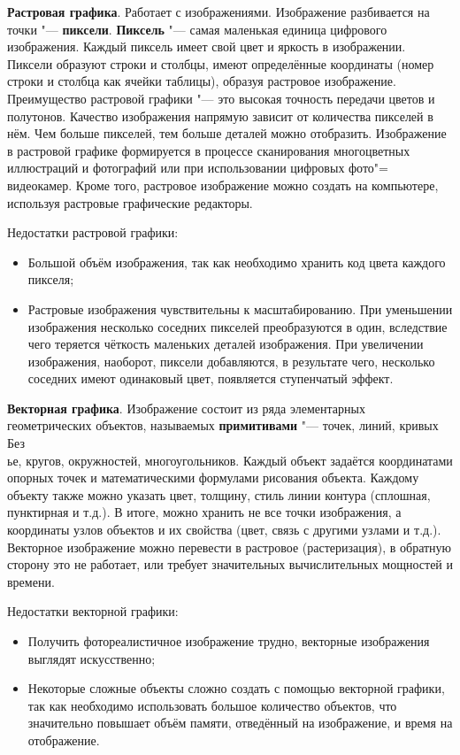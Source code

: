 \textbf{Растровая графика}. Работает с изображениями. Изображение разбивается на точки "--- \textbf{пиксели}. \textbf{Пиксель} "--- самая маленькая единица цифрового изображения. Каждый пиксель имеет свой цвет и яркость в изображении. Пиксели образуют строки и столбцы, имеют определённые координаты (номер строки и столбца как ячейки таблицы), образуя растровое изображение. Преимущество растровой графики "--- это высокая точность передачи цветов и полутонов. Качество изображения напрямую зависит от количества пикселей в нём. Чем больше пикселей, тем больше деталей можно отобразить. Изображение в растровой графике формируется в процессе сканирования многоцветных иллюстраций и фотографий или при использовании цифровых фото"= видеокамер. Кроме того, растровое изображение можно создать на компьютере, используя растровые графические редакторы. \cite{burceva2023cg}

Недостатки растровой графики:
\begin{itemize}
    \item Большой объём изображения, так как необходимо хранить код цвета каждого пикселя;
    \item Растровые изображения чувствительны к масштабированию. При уменьшении изображения несколько соседних пикселей преобразуются в один, вследствие чего теряется чёткость маленьких деталей изображения. При увеличении изображения, наоборот, пиксели добавляются, в результате чего, несколько соседних имеют одинаковый цвет, появляется ступенчатый эффект.
\end{itemize}

\textbf{Векторная графика}. Изображение состоит из ряда элементарных геометрических объектов, называемых \textbf{примитивами} "--- точек, линий, кривых Без\\ье, кругов, окружностей, многоугольников. Каждый объект задаётся координатами опорных точек и математическими формулами рисования объекта. Каждому объекту также можно указать цвет, толщину, стиль линии контура (сплошная, пунктирная и т.д.). В итоге, можно хранить не все точки изображения, а координаты узлов объектов и их свойства (цвет, связь с другими узлами и т.д.). Векторное изображение можно перевести в растровое (растеризация), в обратную сторону это не работает, или требует значительных вычислительных мощностей и времени. \cite{burceva2023cg}

Недостатки векторной графики:
\begin{itemize}
    \item Получить фотореалистичное изображение трудно, векторные изображения выглядят искусственно;
    \item Некоторые сложные объекты сложно создать с помощью векторной графики, так как необходимо использовать большое количество объектов, что значительно повышает объём памяти, отведённый на изображение, и время на отображение.
\end{itemize}

